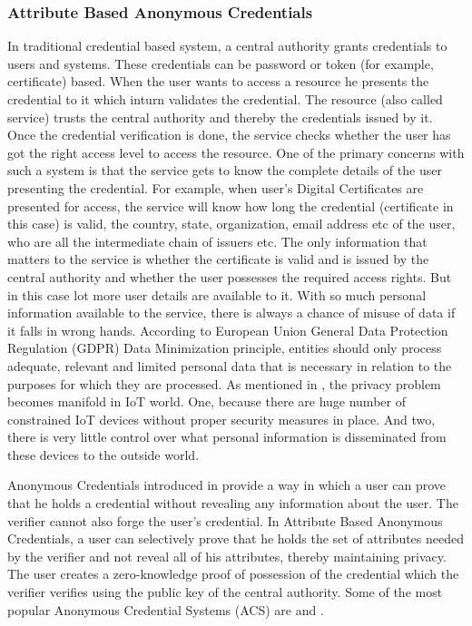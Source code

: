 \documentclass[journal]{IEEEtran}
\begin{document}
\subsubsection{Attribute Based Anonymous Credentials}
In traditional credential based system, a central authority grants credentials to users and systems. These credentials can be password or token (for example, certificate) based. When the user wants to access a resource he presents the credential to it which inturn validates the credential. The resource (also called service) trusts the central authority and thereby the credentials issued by it. Once the credential verification is done, the service checks whether the user has got the right access level to access the resource. One of the primary concerns with such a system is that the service gets to know the complete details of the user presenting the credential. For example, when user's Digital Certificates are presented for access, the service will know how long the credential (certificate in this case) is valid, the country, state, organization, email address etc of the user, who are all the intermediate chain of issuers etc. The only information that matters to the service is whether the certificate is valid and is issued by the central authority and whether the user possesses the required access rights. But in this case lot more user details are available to it. With so much personal information available to the service, there is always a chance of misuse of data if it falls in wrong hands. According to European Union General Data Protection Regulation (GDPR) Data Minimization principle, entities should only process adequate, relevant and limited personal data that is necessary in relation to the purposes for which they are processed. As mentioned in \cite{Ziegeldorf2014PrivacyIT}, the privacy problem becomes manifold in IoT world. One, because there are huge number of constrained IoT devices without proper security measures in place. And two, there is very little control over what personal information is disseminated from these devices to the outside world.

Anonymous Credentials introduced in \cite{chaum83blindsign} provide a way in which a user can prove that he holds a credential without revealing any information about the user. The verifier cannot also forge the user's credential. In Attribute Based Anonymous Credentials, a user can selectively prove that he holds the set of attributes needed by the verifier and not reveal all of his attributes, thereby maintaining privacy. The user creates a zero-knowledge proof of possession of the credential which the verifier verifies using the public key of the central authority. Some of the most popular Anonymous Credential Systems (ACS) are \cite{CamenischH02} and \citep{uprove}.
\end{document}
